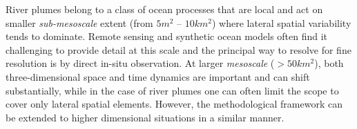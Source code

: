 \documentclass[aoas]{imsart}
\begin{document}




River plumes belong to a class of ocean processes that are local and
act on smaller \emph{sub-mesoscale} extent (from $5 m^2$ -- $10 km^2$) where
lateral spatial variability tends to dominate. Remote sensing and
synthetic ocean models often find it challenging to provide detail at
this scale \citep{Lermusiaux:2006} and the principal way to resolve
for fine resolution is by direct in-situ observation. At larger
\emph{mesoscale} ($>50 km^2$), both three-dimensional space and time
dynamics are important and can shift substantially, while in the case
of river plumes one can often limit the scope to cover only lateral
spatial elements. However, the methodological framework can be
extended to higher dimensional situations in a similar manner.
\end{document}
